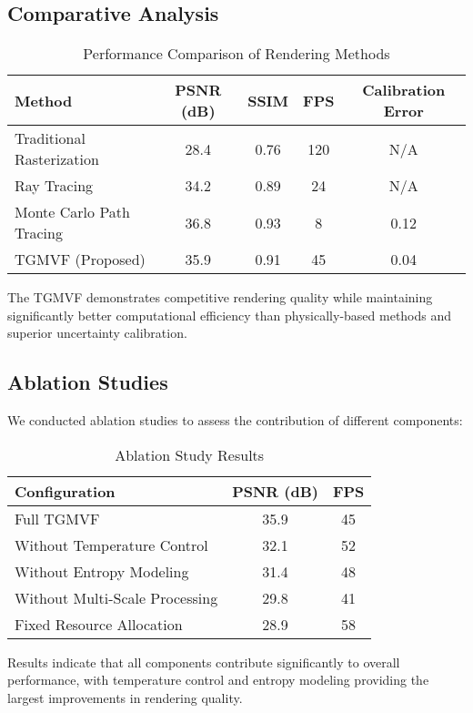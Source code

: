 \documentclass[12pt,a4paper]{article}
\begin{document}
\subsection{Comparative Analysis}

\begin{table}[h]
\centering
\caption{Performance Comparison of Rendering Methods}
\begin{tabular}{@{}lcccc@{}}
\toprule
Method & PSNR (dB) & SSIM & FPS & Calibration Error \\
\midrule
Traditional Rasterization & 28.4 & 0.76 & 120 & N/A \\
Ray Tracing & 34.2 & 0.89 & 24 & N/A \\
Monte Carlo Path Tracing & 36.8 & 0.93 & 8 & 0.12 \\
TGMVF (Proposed) & 35.9 & 0.91 & 45 & 0.04 \\
\bottomrule
\end{tabular}
\end{table}

The TGMVF demonstrates competitive rendering quality while maintaining significantly better computational efficiency than physically-based methods and superior uncertainty calibration.

\subsection{Ablation Studies}

We conducted ablation studies to assess the contribution of different components:

\begin{table}[h]
\centering
\caption{Ablation Study Results}
\begin{tabular}{@{}lcc@{}}
\toprule
Configuration & PSNR (dB) & FPS \\
\midrule
Full TGMVF & 35.9 & 45 \\
Without Temperature Control & 32.1 & 52 \\
Without Entropy Modeling & 31.4 & 48 \\
Without Multi-Scale Processing & 29.8 & 41 \\
Fixed Resource Allocation & 28.9 & 58 \\
\bottomrule
\end{tabular}
\end{table}

Results indicate that all components contribute significantly to overall performance, with temperature control and entropy modeling providing the largest improvements in rendering quality.
\end{document}
